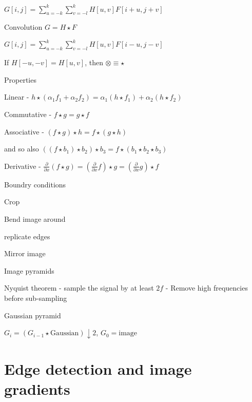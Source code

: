 \documentclass{article}
\begin{document}
\begin{multicols*}{2}
{\begin{compactitem}
		$G[i,j] = \sum_{u=-k}^{k}\sum_{v=-l}^{k}H[u,v]F[i+u,j+v]$

		\item Convolution $G = H \star F$

		$G[i,j] = \sum_{u=-k}^{k}\sum_{v=-l}^{k}H[u,v]F[i-u,j-v]$

		If $H[-u,-v] = H[u,v]$, then $\otimes \equiv \star$

		\item Properties

		\begin{compactitem}
			\item Linear - $h \star (\alpha_1f_1+\alpha_2f_2) = \alpha_1(h \star f_1) + \alpha_2(h \star f_2)$
			\item Commutative - $f \star g = g \star f$
			\item Associative - $(f \star g) \star h = f \star (g \star h)$

			and so also $((f \star b_1) \star b_2) \star b_3 = f \star (b_1 \star b_2 \star b_3)$

			\item Derivative -
			$\frac{\partial}{\partial x}(f \star g) = (\frac{\partial}{\partial x}f) \star g = (\frac{\partial}{\partial x}g) \star f$
		\end{compactitem}

		\item Boundry conditions
		\begin{compactitem}
			\item Crop
			\item Bend image around
			\item replicate edges
			\item Mirror image
		\end{compactitem}

		\item Image pyramids

		Nyquist theorem - sample the signal by at least $2f$
		- Remove high frequencies before sub-sampling

		Gaussian pyramid

		$G_i = (G_{i - 1} \star \text{Gaussian}) \downarrow 2$, $G_0 = \text{image}$

	\end{compactitem}

	\section{Edge detection and image gradients}

}
\end{multicols*}
\end{document}
